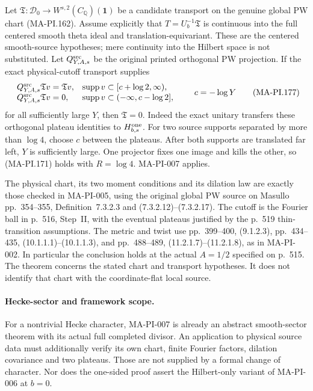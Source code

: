 Let \(\mathfrak T:\mathcal D_0\to
W^{s,2}(C_{\mathbb Q})(\mathbf1)\) be a candidate
transport on the genuine global PW chart (MA-PI.162).
Assume explicitly that \(T=U_b^{-1}\mathfrak T\) is
continuous into the full centered smooth theta ideal
and translation-equivariant.
These are the centered smooth-source hypotheses;
mere continuity into the Hilbert space is not substituted.
Let \(Q^{\rm src}_{Y,A,s}\) be the original printed
orthogonal PW projection.
If the exact physical-cutoff transport supplies
\[
 \begin{array}{ll}
 Q^{\rm src}_{Y,A,s}\mathfrak T v=\mathfrak T v,
       &\operatorname{supp}v\subset[c+\log2,\infty),\\
 Q^{\rm src}_{Y,A,s}\mathfrak T v=0,
       &\operatorname{supp}v\subset(-\infty,c-\log2],
 \end{array}
 \qquad c=-\log Y
 \tag{MA-PI.177}
\]
for all sufficiently large \(Y\), then \(\mathfrak T=0\).
Indeed the exact unitary transfers these orthogonal
plateau identities to \(H^{\rm one}_{b,s}\).
For two source supports separated by more than
\(\log4\), choose \(c\) between the plateaus.
After both supports are translated far left, \(Y\)
is sufficiently large.  One projector fixes one image
and kills the other, so (MA-PI.171) holds with
\(R=\log4\).  MA-PI-007 applies.

The physical chart, its two moment conditions and
its dilation law are exactly those checked in MA-PI-005,
using the original global PW source on Masullo
pp.~354--355, Definition~7.3.2.3 and (7.3.2.12)--(7.3.2.17).
The cutoff is the Fourier ball in p.~516, Step~II,
with the eventual plateaus justified by the p.~519
thin-transition assumptions.
The metric and twist use pp.~399--400, (9.1.2.3),
pp.~434--435, (10.1.1.1)--(10.1.1.3), and
pp.~488--489, (11.2.1.7)--(11.2.1.8), as in MA-PI-002.
In particular the conclusion holds at the actual
\(A=1/2\) specified on p.~515.
The theorem concerns the stated chart and transport
hypotheses.  It does not identify that chart with
the coordinate-flat local source.

\paragraph{Hecke-sector and framework scope.}
For a nontrivial Hecke character, MA-PI-007 is already
an abstract smooth-sector theorem with its actual full
completed divisor.  An application to physical source
data must additionally verify its own chart, finite
Fourier factors, dilation covariance and two plateaus.
Those are not supplied by a formal change of character.
Nor does the one-sided proof assert the Hilbert-only
variant of MA-PI-006 at \(b=0\).

